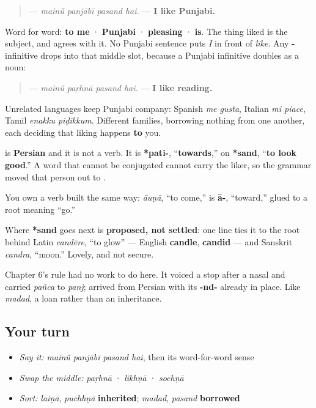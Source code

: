 \begin{grammarlens}[title={Grammar Lens: the thing you like is the subject}]
\begin{quote}
\textbf{   } — \emph{mainū̃ panjābī pasand hai.} — \textbf{I like Punjabi.}
\end{quote}

Word for word: \textbf{to me} · \textbf{Punjabi} · \textbf{pleasing} · \textbf{is}. The thing liked is the subject, and \textbf{} agrees with it. No Punjabi sentence puts \emph{I} in front of \emph{like}. Any \textbf{-} infinitive drops into that middle slot, because a Punjabi infinitive doubles as a noun:

\begin{quote}
\textbf{   } — \emph{mainū̃ paṛhnā pasand hai.} — \textbf{I like reading.}
\end{quote}

Unrelated languages keep Punjabi company: Spanish \emph{me gusta}, Italian \emph{mi piace}, Tamil \emph{enakku piḍikkum}. Different families, borrowing nothing from one another, each deciding that liking happens \textbf{to} you.
\end{grammarlens}

\begin{cousinweb}
\textbf{} is \textbf{Persian} and it is not a verb. It is \textbf{*pati-}, “\textbf{towards},” on \textbf{*sand}, “\textbf{to look good}.” A word that cannot be conjugated cannot carry the liker, so the grammar moved that person out to \textbf{}.

You own a verb built the same way: \textbf{} \emph{āuṇā}, “to come,” is \textbf{ā-}, “toward,” glued to a root meaning “go.”

Where \textbf{*sand} goes next is \textbf{proposed, not settled}: one line ties it to the root behind Latin \emph{candēre}, “to glow” — English \textbf{candle}, \textbf{candid} — and Sanskrit \emph{candra}, “moon.” Lovely, and not secure.

Chapter 6's rule had no work to do here. It voiced a stop after a nasal and carried \emph{pañca} to \emph{panj}; \textbf{} arrived from Persian with its \textbf{-nd-} already in place. Like \emph{madad}, a loan rather than an inheritance.
\end{cousinweb}

\subsection*{Your turn}
\begin{itemize}
\raggedright
  \item \emph{Say it:} \emph{mainū̃ panjābī pasand hai}, then its word-for-word sense
  \item \emph{Swap the middle:} \emph{paṛhnā} · \emph{likhṇā} · \emph{sochṇā}
  \item \emph{Sort:} \emph{laiṇā}, \emph{puchhṇā} \textbf{inherited}; \emph{madad}, \emph{pasand} \textbf{borrowed}
\end{itemize}

